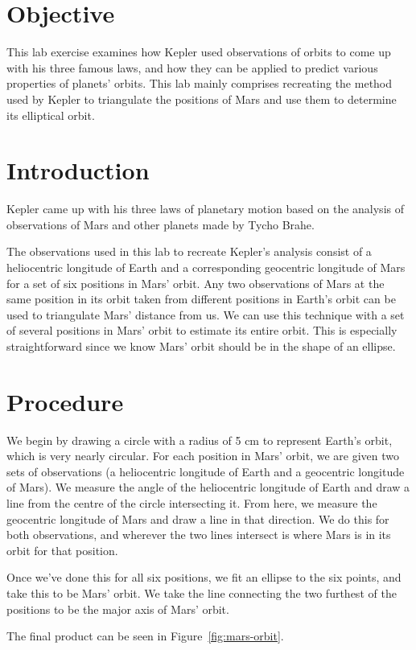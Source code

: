 \documentclass[11pt]{article}
\begin{document}
\section{Objective}
This lab exercise examines how Kepler used observations of orbits to come up with his three famous laws, and how they can be applied to predict various properties of planets' orbits.
This lab mainly comprises recreating the method used by Kepler to triangulate the positions of Mars and use them to determine its elliptical orbit.


\section{Introduction}
Kepler came up with his three laws of planetary motion based on the analysis of observations of Mars and other planets made by Tycho Brahe.

The observations used in this lab to recreate Kepler's analysis consist of a heliocentric longitude of Earth and a corresponding geocentric longitude of Mars for a set of six positions in Mars' orbit.
Any two observations of Mars at the same position in its orbit taken from different positions in Earth's orbit can be used to triangulate Mars' distance from us.
We can use this technique with a set of several positions in Mars' orbit to estimate its entire orbit.
This is especially straightforward since we know Mars' orbit should be in the shape of an ellipse.


\section{Procedure}
We begin by drawing a circle with a radius of 5 cm to represent Earth's orbit, which is very nearly circular.
For each position in Mars' orbit, we are given two sets of observations (a heliocentric longitude of Earth and a geocentric longitude of Mars).
We measure the angle of the heliocentric longitude of Earth and draw a line from the centre of the circle intersecting it.
From here, we measure the geocentric longitude of Mars and draw a line in that direction.
We do this for both observations, and wherever the two lines intersect is where Mars is in its orbit for that position.

Once we've done this for all six positions, we fit an ellipse to the six points, and take this to be Mars' orbit.
We take the line connecting the two furthest of the positions to be the major axis of Mars' orbit.

The final product can be seen in Figure~\ref{fig:mars-orbit}.
\end{document}
